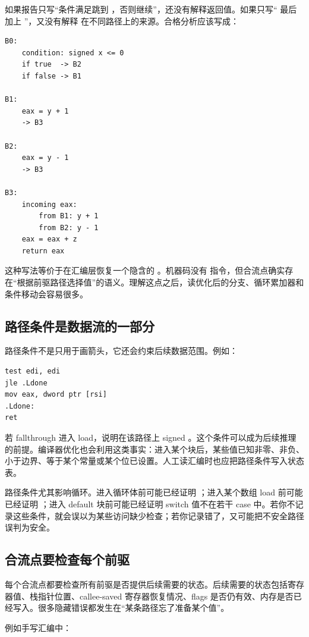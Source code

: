 如果报告只写“条件满足跳到 ，否则继续”，还没有解释返回值。如果只写“ 最后加上 ”，又没有解释  在不同路径上的来源。合格分析应该写成：

\begin{lstlisting}
B0:
    condition: signed x <= 0
    if true  -> B2
    if false -> B1

B1:
    eax = y + 1
    -> B3

B2:
    eax = y - 1
    -> B3

B3:
    incoming eax:
        from B1: y + 1
        from B2: y - 1
    eax = eax + z
    return eax
\end{lstlisting}

这种写法等价于在汇编层恢复一个隐含的 。机器码没有  指令，但合流点确实存在“根据前驱路径选择值”的语义。理解这点之后，读优化后的分支、循环累加器和条件移动会容易很多。

\subsection{路径条件是数据流的一部分}

路径条件不是只用于画箭头，它还会约束后续数据范围。例如：

\begin{lstlisting}
test edi, edi
jle .Ldone
mov eax, dword ptr [rsi]
.Ldone:
ret
\end{lstlisting}

若 fallthrough 进入 load，说明在该路径上 signed 。这个条件可以成为后续推理的前提。编译器优化也会利用这类事实：进入某个块后，某些值已知非零、非负、小于边界、等于某个常量或某个位已设置。人工读汇编时也应把路径条件写入状态表。

路径条件尤其影响循环。进入循环体前可能已经证明 ；进入某个数组 load 前可能已经证明 ；进入 default 块前可能已经证明 switch 值不在若干 case 中。若你不记录这些条件，就会误以为某些访问缺少检查；若你记录错了，又可能把不安全路径误判为安全。

\subsection{合流点要检查每个前驱}

每个合流点都要检查所有前驱是否提供后续需要的状态。后续需要的状态包括寄存器值、栈指针位置、callee-saved 寄存器恢复情况、flags 是否仍有效、内存是否已经写入。很多隐藏错误都发生在“某条路径忘了准备某个值”。

例如手写汇编中：

